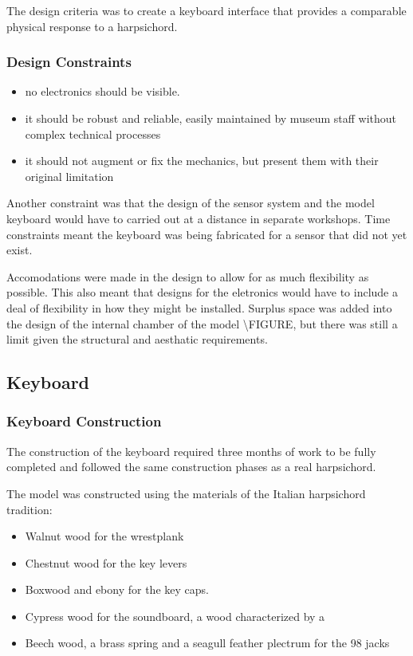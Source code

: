The design criteria was to create a keyboard interface that provides a
comparable physical response to a harpsichord.

\subsubsection{Design Constraints}\label{design-constraints}

\begin{itemize}
\item
  no electronics should be visible.
\item
  it should be robust and reliable, easily maintained by museum staff
  without complex technical processes
\item
  it should not augment or fix the mechanics, but present them with
  their original limitation
\end{itemize}

Another constraint was that the design of the sensor system and the
model keyboard would have to carried out at a distance in separate
workshops. Time constraints meant the keyboard was being fabricated for
a sensor that did not yet exist.

Accomodations were made in the design to allow for as much flexibility
as possible. This also meant that designs for the eletronics would have
to include a deal of flexibility in how they might be installed. Surplus
space was added into the design of the internal chamber of the model
\textbackslash FIGURE, but there was still a limit given the structural
and aesthatic requirements.

\subsection{Keyboard}\label{keyboard}

\subsubsection{Keyboard Construction}\label{keyboard-construction}
The construction of the keyboard required three months of work to be fully completed
and followed the same construction phases as a real harpsichord.

The model was constructed using the materials of the Italian harpsichord
tradition:

\begin{itemize}
\item
  Walnut wood for the wrestplank
\item
  Chestnut wood for the key levers
\item
  Boxwood and ebony for the key caps.
\item
  Cypress wood for the soundboard, a wood characterized by a
\item
  Beech wood, a brass spring and a seagull feather plectrum for the 98 jacks
\end{itemize}

